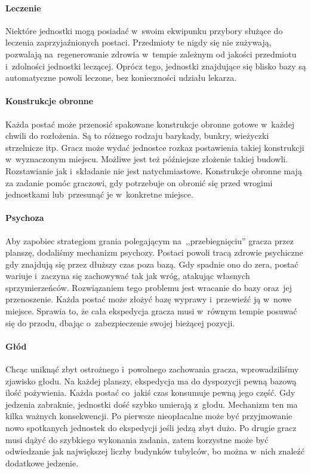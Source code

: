 \documentclass[licencjacka]{pracamgr}
\begin{document}
      \paragraph{Leczenie}
	Niektóre jednostki mogą posiadać w~swoim ekwipunku przybory służące do leczenia zaprzyjaźnionych postaci. Przedmioty te nigdy się nie zużywają,
	pozwalają na~regenerowanie zdrowia w~tempie zależnym od jakości przedmiotu i~zdolności jednostki leczącej. Oprócz tego, jednostki znajdujące się
	blisko bazy są automatyczne powoli leczone, bez konieczności udziału lekarza.
      \paragraph{Konstrukcje obronne}
	Każda postać może przenosić spakowane konstrukcje obronne gotowe w~każdej chwili do rozłożenia. Są to różnego rodzaju barykady, bunkry, wieżyczki
	strzelnicze itp. Gracz może wydać jednostce rozkaz postawienia takiej konstrukcji w~wyznaczonym miejscu. Możliwe jest też późniejsze złożenie takiej
	budowli. Rozstawianie jak i~składanie nie jest natychmiastowe. Konstrukcje obronne mają za zadanie pomóc graczowi,
	gdy potrzebuje on obronić się przed wrogimi jednostkami lub~przesunąć je w~konkretne miejsce.
      \paragraph{Psychoza}
	Aby zapobiec strategiom grania polegającym na~,,przebiegnięciu'' gracza przez planszę, dodaliśmy mechanizm psychozy. Postaci
	powoli tracą zdrowie psychiczne gdy znajdują się przez dłuższy czas poza bazą. Gdy spadnie ono do zera, postać wariuje
	i~zaczyna się zachowywać tak jak wróg, atakując własnych sprzymierzeńców. Rozwiązaniem tego problemu jest wracanie do bazy oraz~jej przenoszenie.
	Każda postać może złożyć bazę wyprawy i~przewieźć ją w~nowe miejsce. Sprawia to, że cała ekspedycja gracza musi w~równym tempie posuwać się
	do przodu, dbając o~zabezpieczenie swojej bieżącej pozycji.
      \paragraph{Głód}
	Chcąc uniknąć zbyt ostrożnego i~powolnego zachowania gracza, wprowadziliśmy zjawisko głodu. Na każdej planszy, ekspedycja ma do dyspozycji pewną
	bazową ilość pożywienia. Każda postać co~jakiś czas konsumuje pewną jego część. Gdy jedzenia zabraknie, jednostki dość szybko
	umierają z~głodu. Mechanizm ten ma kilka ważnych konsekwencji. Po pierwsze nieopłacalne może być przyjmowanie nowo spotkanych jednostek do ekspedycji
	jeśli jedzą zbyt dużo. Po drugie gracz musi dążyć do szybkiego wykonania zadania, zatem korzystne może być odwiedzanie jak największej liczby budynków
	tubylców, bo można w~nich znaleźć dodatkowe jedzenie.
\end{document}

